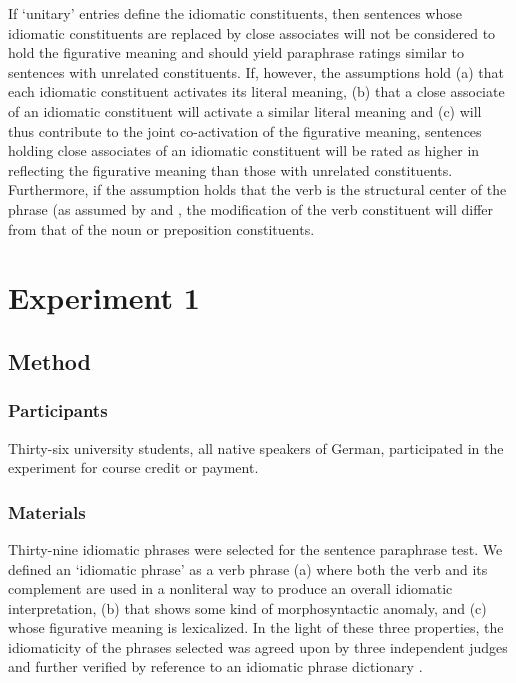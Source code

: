 \documentclass[output=paper]{langsci/langscibook}
\begin{document}
If `unitary' entries define the idiomatic constituents, then sentences whose idiomatic constituents are replaced by close associates will not be considered to hold the figurative meaning and should yield paraphrase ratings similar to sentences with unrelated constituents. If, however, the assumptions hold (a) that each idiomatic constituent activates its literal meaning, (b) that a close associate of an idiomatic constituent will activate a similar literal meaning and (c) will thus contribute to the joint co-activation of the figurative meaning, sentences holding close associates of an idiomatic constituent will be rated as higher in reflecting the figurative meaning than those with unrelated constituents. Furthermore, if the assumption holds that the verb is the structural center of the phrase (as assumed by \citealt{rabanus:2008} and \citealt{smolka:2007}, the modification of the verb constituent will differ from that of the noun or preposition constituents. 


\section{Experiment 1}

\subsection{Method}
\subsubsection{Participants}
Thirty-six university students, all native speakers of German, participated in the experiment for course credit or payment.

\subsubsection{Materials}
Thirty-nine idiomatic phrases were selected for the sentence paraphrase test. We defined an ‘idiomatic phrase’ as a verb phrase (a) where both the verb and its complement are used in a nonliteral way to produce an overall idiomatic interpretation, (b) that shows some kind of morphosyntactic anomaly, and (c) whose figurative meaning is lexicalized.  In the light of these three properties, the idiomaticity of the phrases selected was agreed upon by three independent judges and further verified by reference to an idiomatic phrase dictionary \citep{redewendungen:2002}.
\end{document}
